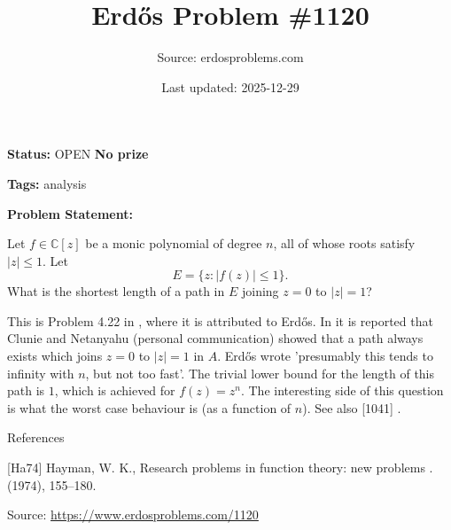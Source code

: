 \documentclass{article}
\title{Erd\H{o}s Problem \#1120}
\date{Last updated: 2025-12-29}
\author{Source: erdosproblems.com}
\begin{document}
\maketitle

\noindent\textbf{Status:} OPEN \quad \textbf{No prize}

\noindent\textbf{Tags:} analysis

\medskip

\noindent\textbf{Problem Statement:}

Let $f\in \mathbb{C}[z]$ be a monic polynomial of degree $n$, all of whose roots satisfy $\lvert z\rvert\leq 1$. Let\[E= \{ z : \lvert f(z)\rvert \leq 1\}.\]What is the shortest length of a path in $E$ joining $z=0$ to $\lvert z\rvert =1$?




This is Problem 4.22 in \cite{Ha74}, where it is attributed to Erd\H{o}s. In \cite{Ha74} it is reported that Clunie and Netanyahu (personal communication) showed that a path always exists which joins $z=0$ to $\lvert z\rvert=1$ in $A$. Erd\H{o}s wrote 'presumably this tends to infinity with $n$, but not too fast'. The trivial lower bound for the length of this path is $1$, which is achieved for $f(z)=z^n$. The interesting side of this question is what the worst case behaviour is (as a function of $n$). See also [1041] .




References

[Ha74] Hayman, W. K., Research problems in function theory: new problems . (1974), 155--180.


\bigskip
\noindent\small{Source: \url{https://www.erdosproblems.com/1120}}
\end{document}
